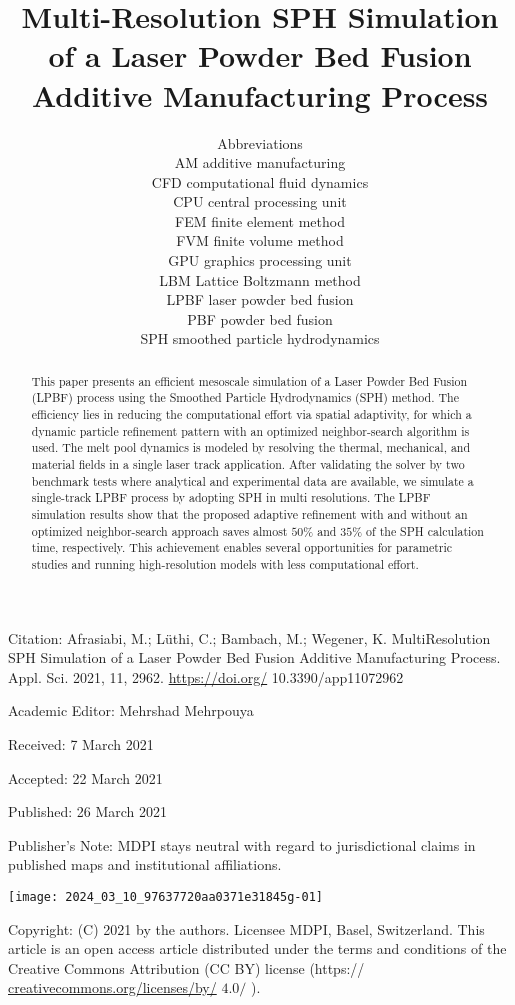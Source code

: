 \documentclass[10pt]{article}
\title{Multi-Resolution SPH Simulation of a Laser Powder Bed Fusion Additive Manufacturing Process }
\author{Abbreviations\\
AM additive manufacturing\\
CFD computational fluid dynamics\\
CPU central processing unit\\
FEM finite element method\\
FVM finite volume method\\
GPU graphics processing unit\\
LBM Lattice Boltzmann method\\
LPBF laser powder bed fusion\\
PBF powder bed fusion\\
SPH smoothed particle hydrodynamics}
\date{}
\begin{document}
\maketitle
Citation: Afrasiabi, M.; Lüthi, C.; Bambach, M.; Wegener, K. MultiResolution SPH Simulation of a Laser Powder Bed Fusion Additive Manufacturing Process. Appl. Sci. 2021, 11, 2962. \href{https://doi.org/}{https://doi.org/} 10.3390/app11072962

Academic Editor: Mehrshad Mehrpouya

Received: 7 March 2021

Accepted: 22 March 2021

Published: 26 March 2021

Publisher's Note: MDPI stays neutral with regard to jurisdictional claims in published maps and institutional affiliations.

\begin{center}
\texttt{[image: 2024\_03\_10\_97637720aa0371e31845g-01]}
\end{center}

Copyright: (C) 2021 by the authors. Licensee MDPI, Basel, Switzerland. This article is an open access article distributed under the terms and conditions of the Creative Commons Attribution (CC BY) license (https:// \href{http://creativecommons.org/licenses/by/}{creativecommons.org/licenses/by/} $4.0 /$ ).

\begin{abstract}
This paper presents an efficient mesoscale simulation of a Laser Powder Bed Fusion (LPBF) process using the Smoothed Particle Hydrodynamics (SPH) method. The efficiency lies in reducing the computational effort via spatial adaptivity, for which a dynamic particle refinement pattern with an optimized neighbor-search algorithm is used. The melt pool dynamics is modeled by resolving the thermal, mechanical, and material fields in a single laser track application. After validating the solver by two benchmark tests where analytical and experimental data are available, we simulate a single-track LPBF process by adopting SPH in multi resolutions. The LPBF simulation results show that the proposed adaptive refinement with and without an optimized neighbor-search approach saves almost $50 \%$ and $35 \%$ of the SPH calculation time, respectively. This achievement enables several opportunities for parametric studies and running high-resolution models with less computational effort.
\end{abstract}
\end{document}
